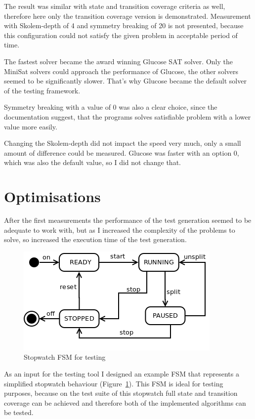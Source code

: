The result was similar with state and transition coverage criteria as well, therefore here only the transition coverage version is demonstrated. Measurement with Skolem-depth of 4 and symmetry breaking of 20 is not presented, because this configuration could not satisfy the given problem in acceptable period of time.

The fastest solver became the award winning Glucose SAT solver. Only the MiniSat solvers could approach the performance of Glucose, the other solvers seemed to be significantly slower. That's why Glucose became the default solver of the testing framework.

Symmetry breaking with a value of 0 was also a clear choice, since the documentation suggest, that the programs solves satisfiable problem with a lower value more easily. 

Changing the Skolem-depth did not impact the speed very much, only a small amount of difference could be measured. Glucose was faster with an option 0, which was also the default value, so I did not change that.


\section{Optimisations}
\label{sec:optimalisations}

After the first measurements the performance of the test generation seemed to be adequate to work with, but as I increased the complexity of the problems to solve, so increased the execution time of the test generation. 

\begin{figure}[htp]
\centering
\includegraphics[scale=0.5]{figures/measurements_stopwatch}
\caption{Stopwatch FSM for testing}
\label{fig:measurements_stopwatch}
\end{figure}

As an input for the testing tool I designed an example FSM that represents a simplified stopwatch behaviour (Figure~\ref{fig:measurements_stopwatch}). This FSM is ideal for testing purposes, because on the test suite of this stopwatch full state and transition coverage can be achieved and therefore both of the implemented algorithms can be tested.

